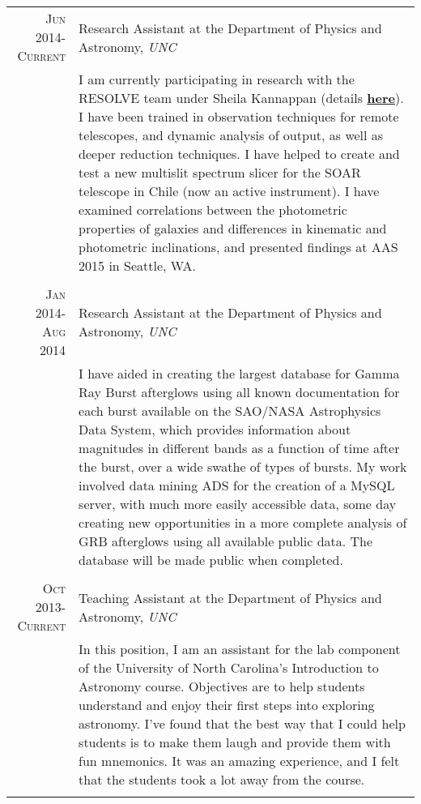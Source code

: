 \documentclass[a4paper,10pt]{article} %
\begin{document}
\begin{tabular}{r|p{11cm}}
\textsc{Jun 2014-Current} & Research Assistant at the Department of Physics and Astronomy, \emph{UNC} \\ 
& \footnotesize{I am currently participating in research with the RESOLVE team under Sheila Kannappan (details \textbf{\href{http://resolve.astro.unc.edu/}{here}}). I have been trained in observation techniques for remote telescopes, and dynamic analysis of output, as well as deeper reduction techniques. I have helped to create and test a new multislit spectrum slicer for the SOAR telescope in Chile (now an active instrument). I have examined correlations between the photometric properties of galaxies and differences in kinematic and photometric inclinations, and presented findings at AAS 2015 in Seattle, WA.}\\
\multicolumn{2}{c}{} \\


\textsc{Jan 2014-Aug 2014} & Research Assistant at the Department of Physics and Astronomy, \emph{UNC} \\ 
& \footnotesize{I have aided in creating the largest database for Gamma Ray Burst afterglows using all known documentation for each burst available on the SAO/NASA Astrophysics Data System, which provides information about magnitudes in different bands as a function of time after the burst, over a wide swathe of types of bursts. My work involved data mining ADS for the creation of a MySQL server, with much more easily accessible data, some day creating new opportunities in a more complete analysis of GRB afterglows using all available public data. The database will be made public when completed.}\\
\multicolumn{2}{c}{} \\


\textsc{Oct 2013-Current} & Teaching Assistant at the Department of Physics and Astronomy, \emph{UNC} \\
& \footnotesize{In this position, I am an assistant for the lab component of the University of North Carolina's Introduction to Astronomy course. Objectives are to help students understand and enjoy their first steps into exploring astronomy. I've found that the best way that I could help students is to make them laugh and provide them with fun mnemonics. It was an amazing experience, and I felt that the students took a lot away from the course.}\\
\multicolumn{2}{c}{} \\


\end{tabular}
\end{document}
